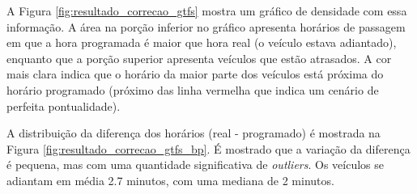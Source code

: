 \documentclass[        
    a4paper,          %
    12pt,             %
    chapter=TITLE,    %
    section=Title,    %
    subsection=Title, %
    oneside,          %
    english,          %
    spanish,          %
    brazil,           %
    fleqn             %
]{abntex2}
\begin{document}
  A Figura \ref{fig:resultado_correcao_gtfs} mostra um gráfico de densidade com essa informação. A área na porção inferior no gráfico apresenta horários de passagem em que a hora programada é maior que hora real (o veículo estava adiantado), enquanto que a porção superior apresenta veículos que estão atrasados. A cor mais clara indica que o horário da maior parte dos veículos está próxima do horário programado (próximo das linha vermelha que indica um cenário de perfeita pontualidade).
  
  \begin{figure}[!h]
  \captionsetup{width=16cm}
  \centering
  \end{figure}
  
  A distribuição da diferença dos horários (real - programado) é mostrada na Figura \ref{fig:resultado_correcao_gtfs_bp}. É mostrado que a variação da diferença é pequena, mas com uma quantidade significativa de \emph{outliers}. Os veículos se adiantam em média 2.7 minutos, com uma mediana de 2 minutos.
  
  \begin{figure}[!h]
  \captionsetup{width=16cm}
  \centering
  \end{figure}
  
\end{document}
